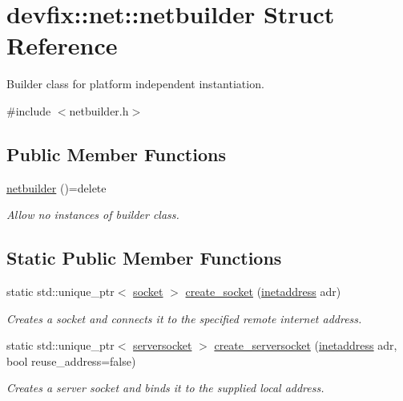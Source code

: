 \hypertarget{structdevfix_1_1net_1_1netbuilder}{}\section{devfix\+:\+:net\+:\+:netbuilder Struct Reference}
\label{structdevfix_1_1net_1_1netbuilder}


Builder class for platform independent instantiation.  




{\ttfamily \#include $<$netbuilder.\+h$>$}

\subsection*{Public Member Functions}
\begin{DoxyCompactItemize}
\item 
\hyperlink{structdevfix_1_1net_1_1netbuilder_a36946dc1bd85a68d5c38aaf8533dd401}{netbuilder} ()=delete
\begin{DoxyCompactList}\small\item\em Allow no instances of builder class. \end{DoxyCompactList}\end{DoxyCompactItemize}
\subsection*{Static Public Member Functions}
\begin{DoxyCompactItemize}
\item 
static std\+::unique\+\_\+ptr$<$ \hyperlink{structdevfix_1_1net_1_1socket}{socket} $>$ \hyperlink{structdevfix_1_1net_1_1netbuilder_a9d9eb6cb050ca920aa647baaf4692405}{create\+\_\+socket} (\hyperlink{structdevfix_1_1net_1_1inetaddress}{inetaddress} adr)
\begin{DoxyCompactList}\small\item\em Creates a socket and connects it to the specified remote internet address. \end{DoxyCompactList}\item 
static std\+::unique\+\_\+ptr$<$ \hyperlink{structdevfix_1_1net_1_1serversocket}{serversocket} $>$ \hyperlink{structdevfix_1_1net_1_1netbuilder_a9d685e1822c0be5d68fd6ba62876798b}{create\+\_\+serversocket} (\hyperlink{structdevfix_1_1net_1_1inetaddress}{inetaddress} adr, bool reuse\+\_\+address=false)
\begin{DoxyCompactList}\small\item\em Creates a server socket and binds it to the supplied local address. \end{DoxyCompactList}\end{DoxyCompactItemize}


